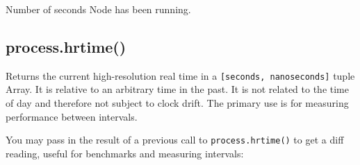 Number of seconds Node has been running.

\subsection{process.hrtime()}

Returns the current high-resolution real time in a
\texttt{{[}seconds, nanoseconds{]}} tuple Array. It is relative to an
arbitrary time in the past. It is not related to the time of day and
therefore not subject to clock drift. The primary use is for measuring
performance between intervals.

You may pass in the result of a previous call to
\texttt{process.hrtime()} to get a diff reading, useful for benchmarks
and measuring intervals:

\begin{Shaded}
\end{Shaded}

